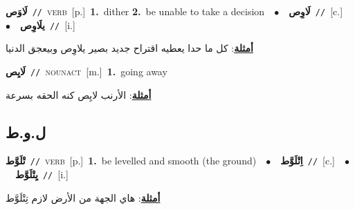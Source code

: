 \documentclass[10pt,a4paper,twoside]{article} %
\begin{document}
\begin{multicols}{2}
{\setlength\topsep{0pt}\textbf{\foreignlanguage{arabic}{لَاوَص}}\ {\color{gray}\texttt{//}\color{black}}\ \textsc{verb}\ [p.]\ \textbf{1.}~dither  \textbf{2.}~be unable to take a decision\ \ $\bullet$\ \ \setlength\topsep{0pt}\textbf{\foreignlanguage{arabic}{لَاوِص}}\ {\color{gray}\texttt{//}\color{black}}\ [c.]\ \ $\bullet$\ \ \setlength\topsep{0pt}\textbf{\foreignlanguage{arabic}{يلَاوِص}}\ {\color{gray}\texttt{//}\color{black}}\ [i.]\  \begin{flushright}\color{gray}\foreignlanguage{arabic}{\textbf{\underline{\foreignlanguage{arabic}{أمثلة}}}: كل ما حدا يعطيه اقتراح جديد بصير يلاوِص وبيعجق الدنيا}\end{flushright}\color{black}} \vspace{2mm}

{\setlength\topsep{0pt}\textbf{\foreignlanguage{arabic}{لَايِص}}\ {\color{gray}\texttt{//}\color{black}}\ \textsc{noun\textunderscore act}\ [m.]\ \textbf{1.}~going away\  \begin{flushright}\color{gray}\foreignlanguage{arabic}{\textbf{\underline{\foreignlanguage{arabic}{أمثلة}}}: الأرنب لايِص كنه الحقه بسرعة}\end{flushright}\color{black}} \vspace{2mm}

\vspace{-3mm}
\subsection*{\color{blue}\foreignlanguage{arabic}{ل.و.ط}\color{blue}{}} 

{\setlength\topsep{0pt}\textbf{\foreignlanguage{arabic}{تْلَوَّط}}\ {\color{gray}\texttt{//}\color{black}}\ \textsc{verb}\ [p.]\ \textbf{1.}~be levelled and smooth (the ground)\ \ $\bullet$\ \ \setlength\topsep{0pt}\textbf{\foreignlanguage{arabic}{اِتْلَوَّط}}\ {\color{gray}\texttt{//}\color{black}}\ [c.]\ \ $\bullet$\ \ \setlength\topsep{0pt}\textbf{\foreignlanguage{arabic}{يِتْلَوَّط}}\ {\color{gray}\texttt{//}\color{black}}\ [i.]\  \begin{flushright}\color{gray}\foreignlanguage{arabic}{\textbf{\underline{\foreignlanguage{arabic}{أمثلة}}}: هاي الجهة من الأرض لازم تِتْلَوَّط}\end{flushright}\color{black}} \vspace{2mm}


\end{multicols}
\end{document}
